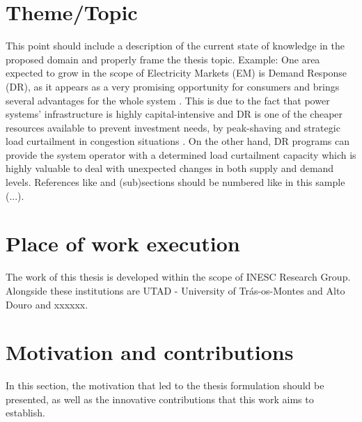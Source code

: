 \documentclass[12pt]{article}
\begin{document}
\section{Theme/Topic} 
This point should include a description of the current state of knowledge in the proposed domain and properly frame the thesis topic.
Example: One area expected to grow in the scope of Electricity Markets (EM) is Demand Response (DR), as it appears as a very promising opportunity for consumers and brings several advantages for the whole system \cite{Hunt}. This is due to the fact that power systems’ infrastructure is highly capital-intensive and DR is one of the cheaper resources available to prevent investment needs, by peak-shaving and strategic load curtailment in congestion situations \cite{Aalami}. On the other hand, DR programs can provide the system operator with a determined load curtailment capacity which is highly valuable to deal with unexpected changes in both supply and demand levels. References like \cite{Walawalkar} and (sub)sections should be numbered like in this sample (...).

\section{Place of work execution}
The work of this thesis is developed within the scope of INESC Research Group. Alongside these institutions are UTAD - University of Trás-os-Montes and Alto Douro and xxxxxx.

\section{Motivation and contributions}
In this section, the motivation that led to the thesis formulation should be presented, as well as the innovative contributions that this work aims to establish.
\end{document}
